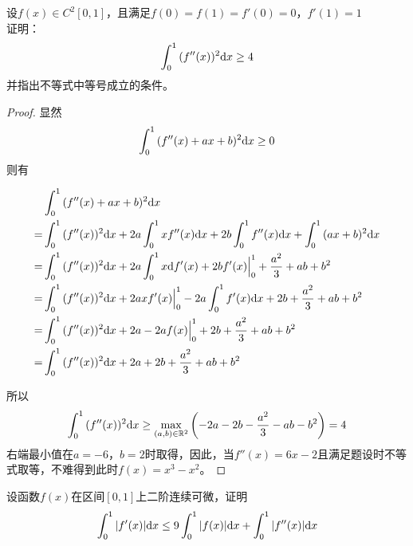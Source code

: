 \begin{proposition}

    设$f(x) \in C^2[0,1]$，且满足$f(0) = f(1) = f'(0) = 0$，$f'(1) = 1$\\
    证明：
    $$\int_{0}^{1}{(f''(x))^2}\mathrm{d} x \geq 4$$
    并指出不等式中等号成立的条件。

\end{proposition}

\begin{proof}

    显然
    $$\int_{0}^{1}{(f''(x) + ax + b)^2}\mathrm{d} x \geq 0$$
    则有

    \begin{align*}
        & \int_{0}^{1}{(f''(x) + ax + b)^2}\mathrm{d} x \\
        = & \int_{0}^{1}{(f''(x))^2}\mathrm{d} x + 2a \int_{0}^{1}{xf''(x)}\mathrm{d} x + 2b \int_{0}^{1}{f''(x)}\mathrm{d} x + \int_{0}^{1}{(ax + b)^2}\mathrm{d} x \\
        = & \int_{0}^{1}{(f''(x))^2}\mathrm{d} x + 2a \int_{0}^{1}{x}\mathrm{d} f'(x) + 2b f'(x) \Big|_{0}^{1} + \dfrac{a^2}{3} + ab + b^2 \\
        = & \int_{0}^{1}{(f''(x))^2}\mathrm{d} x + 2a xf'(x)\Big|_{0}^{1} - 2a \int_{0}^{1}{f'(x)}\mathrm{d} x + 2b + \dfrac{a^2}{3} + ab + b^2 \\
        = & \int_{0}^{1}{(f''(x))^2}\mathrm{d} x + 2a - 2af(x)\Big|_{0}^{1} + 2b + \dfrac{a^2}{3} + ab + b^2 \\
        = & \int_{0}^{1}{(f''(x))^2}\mathrm{d} x + 2a + 2b + \dfrac{a^2}{3} + ab + b^2
    \end{align*}

    所以
    $$\int_{0}^{1}{(f''(x))^2}\mathrm{d} x \geq \max_{(a,b) \in \mathbb{R}^2}\left(-2a - 2b - \dfrac{a^2}{3} - ab - b^2 \right) = 4$$
    右端最小值在$a = -6$，$b = 2$时取得，因此，当$f''(x) = 6x - 2$且满足题设时不等式取等，不难得到此时$f(x) = x^3 - x^2$。
    
\end{proof}

\begin{proposition}

    设函数$f(x)$在区间$[0,1]$上二阶连续可微，证明
    $$\int_{0}^{1}{|f'(x)|}\mathrm{d} x \leq 9\int_{0}^{1}{|f(x)|}\mathrm{d} x + \int_{0}^{1}{|f''(x)|}\mathrm{d} x$$

\end{proposition}

